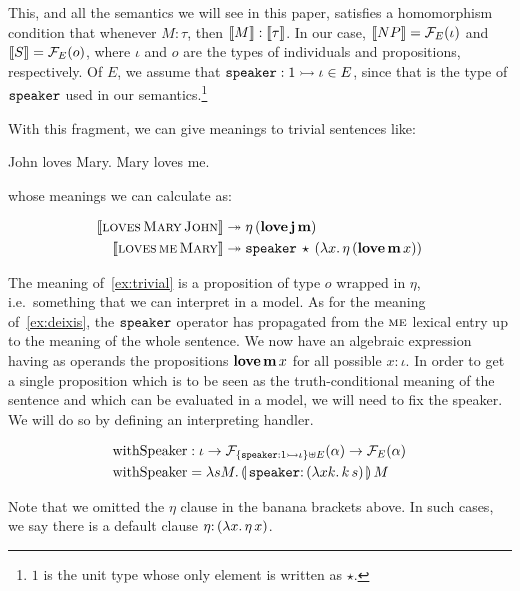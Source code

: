 \documentclass{llncs}
\newcommand{\negSpaceBeforeAlign}{\vspace{-4mm}}
\begin{document}
This, and all the semantics we will see in this paper, satisfies a
homomorphism condition that whenever $M : \tau$, then $\llbracket M \rrbracket :
\llbracket \tau \rrbracket$. In our case, $\llbracket NP \rrbracket = \mathcal{F}_E(\iota)$ and $\llbracket S \rrbracket =
\mathcal{F}_E(o)$, where $\iota$ and $o$ are the types of individuals and
propositions, respectively. Of $E$, we assume that
$\mathtt{speaker} : 1 \rightarrowtail \iota \in E$, since that is the type of
$\mathtt{speaker}$ used in our semantics.\footnote{$1$ is the unit type whose
  only element is written as $\star$.}

With this fragment, we can give meanings to trivial sentences like:

\begin{exe}
  \ex John loves Mary. \label{ex:trivial}
  \ex Mary loves me. \label{ex:deixis}
\end{exe}

whose meanings we can calculate as:

\negSpaceBeforeAlign

\begin{align}
  \llbracket \textsc{loves}\,\textsc{Mary}\,\textsc{John} \rrbracket & \twoheadrightarrow 
  \eta\,(\textbf{love}\,\textbf{j}\,\textbf{m}) \\
  \llbracket \textsc{loves}\,\textsc{me}\,\textsc{Mary} \rrbracket & \twoheadrightarrow
  \mathtt{speaker}\,\star\,(\lambda x.\, \eta\,(\textbf{love}\,\textbf{m}\,x))
\end{align}

The meaning of~\eqref{ex:trivial} is a proposition of type $o$ wrapped in
$\eta$, i.e.\ something that we can interpret in a model. As for the
meaning of~\eqref{ex:deixis}, the $\mathtt{speaker}$ operator has propagated
from the $\textsc{me}$ lexical entry up to the meaning of the whole
sentence. We now have an algebraic expression having as operands the
propositions $\textbf{love}\,\textbf{m}\,x$ for all possible $x :
\iota$. In order to get a single proposition which is to be seen as the
truth-conditional meaning of the sentence and which can be evaluated in a
model, we will need to fix the speaker. We will do so by defining an
interpreting handler.

\negSpaceBeforeAlign

\begin{align*}
  \withSpeaker &: \iota \to \FF_{\{\typedop{speaker}{1}{\iota}\} \uplus
    E}(\alpha) \to \FF_E(\alpha) \\
  \withSpeaker &= \lam{s M}{\ap{\banana{\onto{\op{speaker}}{(\lam{x k}{\ap{k}{s}})}}}{M}}
\end{align*}

Note that we omitted the $\eta$ clause in the banana brackets above. In
such cases, we say there is a default clause
$\onto{\eta}{(\lam{x}{\etaE{x}})}$.
\end{document}
